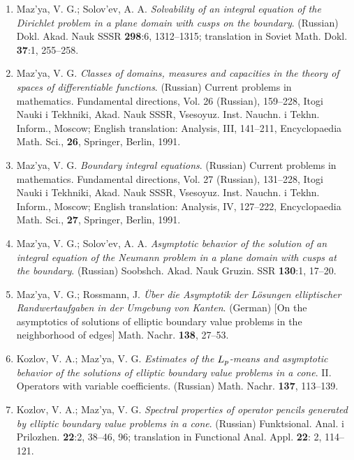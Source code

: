 \documentclass{article}
\begin{document}
\begin{enumerate}
{\bf 1988}
\item Maz'ya, V. G.; Solov'ev, A. A. {\it Solvability of an integral
equation of the Dirichlet problem in a plane
domain with cusps on the boundary}. (Russian) Dokl. Akad. Nauk SSSR
{\bf
298}:6, 1312--1315; translation in Soviet Math.
Dokl. {\bf 37}:1, 255--258.
\item Maz'ya, V. G. {\it Classes of domains, measures and capacities
in the
theory of spaces of differentiable functions}.
(Russian) Current problems in mathematics. Fundamental directions,
Vol. 26
(Russian), 159--228, Itogi Nauki i Tekhniki, Akad.
Nauk SSSR, Vsesoyuz. Inst. Nauchn. i Tekhn. Inform., Moscow; English
translation: Analysis, III, 141--211, Encyclopaedia
Math. Sci., {\bf 26}, Springer, Berlin, 1991.
\item Maz'ya, V. G. {\it Boundary integral equations}. (Russian)
Current
problems in mathematics. Fundamental
directions, Vol. 27 (Russian), 131--228, Itogi Nauki i Tekhniki, Akad.
Nauk
SSSR, Vsesoyuz. Inst. Nauchn. i Tekhn. Inform.,
Moscow; English translation: Analysis, IV, 127--222, Encyclopaedia
Math.
Sci., {\bf 27},
Springer, Berlin, 1991.
\item Maz'ya, V. G.; Solov'ev, A. A. {\it Asymptotic behavior of the
solution of an integral equation of the
Neumann problem in a plane domain with cusps at the boundary}.
(Russian)
Soobshch. Akad. Nauk Gruzin. SSR {\bf 130}:1,
17--20.
\item Maz'ya, V. G.; Rossmann, J. {\it \"Uber die Asymptotik der
L\"osungen
elliptischer Randwertaufgaben in der
Umgebung von Kanten}. (German) [On the asymptotics of solutions of
elliptic
boundary value problems in the neighborhood of edges]
Math. Nachr. {\bf 138}, 27--53.
\item Kozlov, V. A.; Maz'ya, V. G. {\it Estimates of the $L\sb
p$-means and
asymptotic behavior of the solutions of elliptic boundary value
problems in
a cone}. II. Operators with variable coefficients. (Russian) Math.
Nachr.
{\bf 137}, 113--139.


\item Kozlov, V. A.; Maz'ya, V. G. {\it Spectral properties of
operator
pencils generated by elliptic boundary value problems in a cone}.
(Russian)
Funktsional. Anal. i Prilozhen. {\bf 22}:2, 38--46, 96; translation in
Functional Anal. Appl. {\bf 22}: 2, 114--121.


\end{enumerate}
\end{document}
